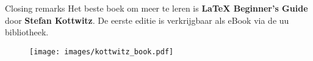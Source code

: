 \begin{frame}{Closing remarks}
    Het beste boek om meer te leren is \textbf{LaTeX Beginner's Guide} door \textbf{Stefan Kottwitz}. 
    De eerste editie is verkrijgbaar als eBook via de uu bibliotheek.
    \begin{figure}
        \centering
    \texttt{[image: images/kottwitz\_book.pdf]}
\end{figure}
\end{frame}